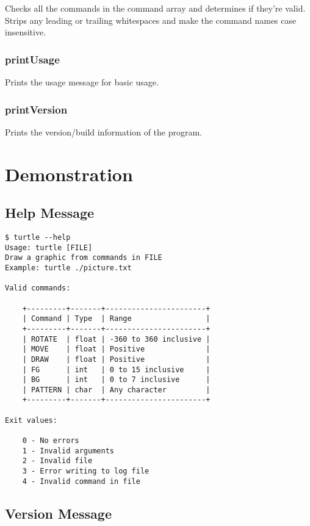 \documentclass[a4paper, 12pt, titlepage]{article}
\begin{document}
Checks all the commands in the command array and determines if they're valid.
Strips any leading or trailing whitespaces and make the command names case
insensitive.

\subsubsection{printUsage}

Prints the usage message for basic usage.

\subsubsection{printVersion}

Prints the version/build information of the program.


\newpage


\section{Demonstration}

\subsection{Help Message}

\begin{lstlisting}
$ turtle --help
Usage: turtle [FILE]
Draw a graphic from commands in FILE
Example: turtle ./picture.txt

Valid commands:

    +---------+-------+-----------------------+
    | Command | Type  | Range                 |
    +---------+-------+-----------------------+
    | ROTATE  | float | -360 to 360 inclusive |
    | MOVE    | float | Positive              |
    | DRAW    | float | Positive              |
    | FG      | int   | 0 to 15 inclusive     |
    | BG      | int   | 0 to 7 inclusive      |
    | PATTERN | char  | Any character         |
    +---------+-------+-----------------------+

Exit values:

    0 - No errors
    1 - Invalid arguments
    2 - Invalid file
    3 - Error writing to log file
    4 - Invalid command in file

\end{lstlisting}

\subsection{Version Message}
\end{document}
